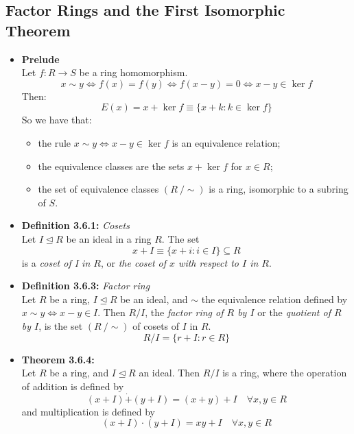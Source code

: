 \documentclass[11pt,a4paper]{article}
\begin{document}
\subsection{Factor Rings and the First Isomorphic Theorem}

\begin{itemize}

    \item \textbf{Prelude} \\
        Let $f : R \to S$ be a ring homomorphism.
        \[
            x \sim y \iff f(x) = f(y) \iff f(x-y) = 0 \iff x - y \in \ker f
        \]
        Then:
        \[
            E(x) = x + \ker f \equiv \{x + k : k \in \ker f \}
        \]
        So we have that:
        \begin{itemize}
            \item the rule $x \sim y \iff x - y \in \ker f$ is an equivalence relation;
            \item the equivalence classes are the sets $x + \ker f$ for $x \in R$;
            \item the set of equivalence classes $(R \ / \sim)$ is a ring,
                isomorphic to a subring of $S$.
        \end{itemize}

    \item \textbf{Definition 3.6.1:} \emph{Cosets} \\
        Let $I \trianglelefteq R$ be an ideal in a ring $R$.
        The set
        \[
            x+I \equiv \{x + i : i \in I\} \subseteq R
        \]
        is a \emph{coset of I in $R$}, or
        \emph{the coset of $x$ with respect to $I$ in $R$}.

    \item \textbf{Definition 3.6.3:} \emph{Factor ring} \\
        Let $R$ be a ring, $I \trianglelefteq R$ be an ideal, and $\sim$ the equivalence relation
        defined by
        $x \sim y \iff x-y \in I$.
        Then $R/I$, the \emph{factor ring of $R$ by $I$} or the \emph{quotient of $R$ by $I$},
        is the set $(R \ / \sim)$ of cosets of $I$ in $R$.
        \[
            R/I = \{r + I : r \in R \}
        \]

    \item \textbf{Theorem 3.6.4:} \\
        Let $R$ be a ring, and $I \trianglelefteq R$ an ideal.
        Then $R/I$ is a ring, where the operation of addition is defined by
        \[
            (x+I) \dot{+} (y+I) = (x+y) + I \quad \forall x,y \in R
        \]
        and multiplication is defined by
        \[
            (x+I) \cdot (y+I) = x y + I \quad \forall x,y \in R
        \]


\end{itemize}
\end{document}
